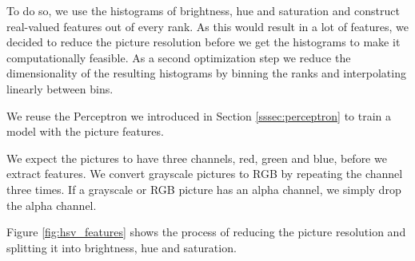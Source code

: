 \documentclass[11pt]{article}
\begin{document}
To do so, we use the histograms of brightness, hue and saturation and construct
real-valued features out of every rank.
As this would result in a lot of features, we decided to reduce the picture
resolution before we get the histograms to make it computationally feasible.
As a second optimization step we reduce the dimensionality of the resulting
histograms by binning the ranks and interpolating linearly between bins.

We reuse the Perceptron we introduced in Section
\ref{sssec:perceptron} to train a model with the picture features.

We expect the pictures to have three channels, red, green and blue, before we
extract features.
We convert grayscale pictures to RGB by repeating the channel three times.
If a grayscale or RGB picture has an alpha channel, we simply drop the alpha
channel.

Figure \ref{fig:hsv_features} shows the process of reducing the picture resolution
and splitting it into brightness, hue and saturation.
\end{document}
